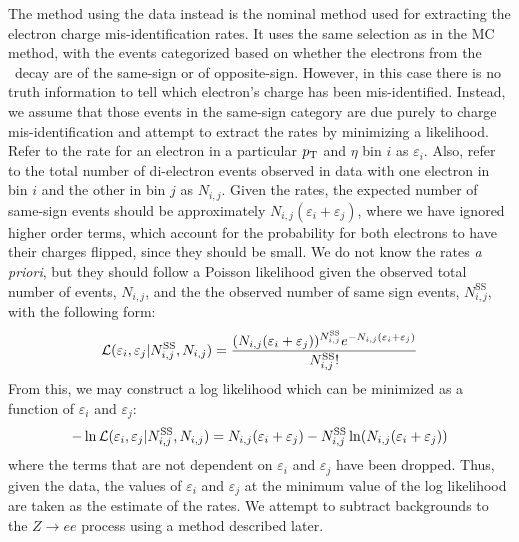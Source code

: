 The method using the data instead is the nominal method used 
for extracting the electron charge mis-identification
rates.
It uses the same selection as in the MC method, with the events
categorized based on whether the electrons from the \z~decay 
are of the same-sign or of opposite-sign.
However, in this case
there is no truth information to tell which electron's charge
has been mis-identified. Instead, we assume that those events in
the same-sign category are due purely to charge mis-identification
and attempt to extract the rates by minimizing a likelihood.
Refer to the rate for an electron in a 
particular $p_{\mathrm{T}}$ and $\eta$ bin $i$ as $\varepsilon_i$.
Also, refer to the total number of di-electron events observed in data with one electron
in bin $i$ and the other in bin $j$ as $N_{i,j}$.
Given the rates, the expected number of same-sign events
should be approximately $N_{i,j}(\varepsilon_i + \varepsilon_j)$,
where we have ignored higher order terms, which account for  
the probability for both electrons to have their
charges flipped, since they should be small. We do
not know the rates \emph{a priori}, but they should follow 
a Poisson likelihood given the observed total number of events,
$N_{i,j}$, and the the observed number of same sign events,
$N_{i,j}^{\textrm{SS}}$, with the following form:
\begin{equation}
\mathcal{L}( \varepsilon_i,\varepsilon_j | N_{i,j}^{\textrm{SS}},N_{i,j})
=
\frac{(N_{i,j}(\varepsilon_i+\varepsilon_j))^{N^{\textrm{SS}}_{i,j}} e^{-N_{i,j}(\varepsilon_i+\varepsilon_j)}}{N^{\textrm{SS}}_{i,j}!}
\end{equation}
From this, we may construct a log likelihood which can be minimized
as a function of $\varepsilon_i$ and $\varepsilon_j$:
\begin{equation}
-\ln \mathcal{L}( \varepsilon_i,\varepsilon_j | N_{i,j}^{\textrm{SS}},N_{i,j}) = 
N_{i,j}(\varepsilon_i+\varepsilon_j)
- N^{\textrm{SS}}_{i,j} \ln(N_{i,j}(\varepsilon_i+\varepsilon_j))
\end{equation}
where the terms that are not dependent on $\varepsilon_i$
and $\varepsilon_j$ have been dropped.
Thus, given the data, the values of $\varepsilon_i$ and $\varepsilon_j$
at the minimum value of the log likelihood are taken as the estimate
of the rates.
We attempt to subtract backgrounds to the $Z\rightarrow ee$ process using a method described later.

